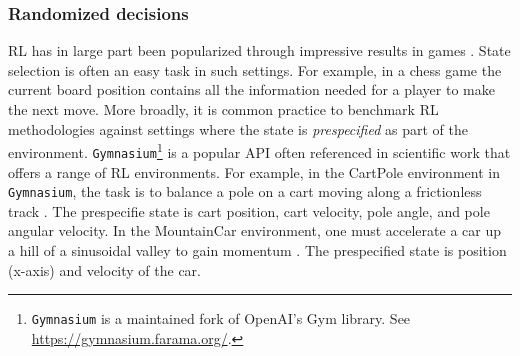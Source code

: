 \documentclass[12pt,a4paper]{article}
\theoremstyle{definition}
\begin{document}
\subsubsection{Randomized decisions}
RL has in large part been popularized through impressive results in
games \parencite{silver_mastering_2016}. State selection is often an
easy task in such settings. For example, in a chess game the
current board position contains all the information
needed for a player to make the next move. More broadly, it is
common practice to benchmark RL methodologies
against settings where the state is \emph{prespecified} as part of the
environment. \texttt{Gymnasium}\footnote{\texttt{Gymnasium} is a
  maintained fork of
  OpenAI's Gym library. See \url{https://gymnasium.farama.org/}.} is a
popular API often referenced in scientific work that offers a range
of RL environments. For example, in the CartPole environment in
\texttt{Gymnasium}, the
task is to balance a pole on a cart moving along a frictionless track
\parencite{bartosutton1983}. The prespecifie state is cart
position, cart velocity, pole angle, and pole angular velocity.
In the MountainCar environment, one
must accelerate a car up a hill of a sinusoidal valley to gain
momentum \parencite{Moore90efficientmemory-based}. The prespecified
state is position (x-axis) and velocity of the car.

\end{document}
